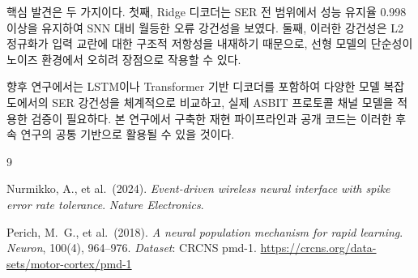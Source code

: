 \documentclass[12pt, a4paper]{article}
\begin{document}
핵심 발견은 두 가지이다.
첫째, Ridge 디코더는 SER 전 범위에서 성능 유지율 0.998 이상을 유지하여
SNN 대비 월등한 오류 강건성을 보였다.
둘째, 이러한 강건성은 L2 정규화가 입력 교란에 대한 구조적 저항성을 내재하기 때문으로,
선형 모델의 단순성이 노이즈 환경에서 오히려 장점으로 작용할 수 있다.

향후 연구에서는 LSTM이나 Transformer 기반 디코더를 포함하여
다양한 모델 복잡도에서의 SER 강건성을 체계적으로 비교하고,
실제 ASBIT 프로토콜 채널 모델을 적용한 검증이 필요하다.
본 연구에서 구축한 재현 파이프라인과 공개 코드는
이러한 후속 연구의 공통 기반으로 활용될 수 있을 것이다.

\begin{thebibliography}{9}

Nurmikko, A., et al.\ (2024).
\textit{Event-driven wireless neural interface with spike error rate tolerance}.
\textit{Nature Electronics}.

Perich, M.\ G., et al.\ (2018).
\textit{A neural population mechanism for rapid learning}.
\textit{Neuron}, 100(4), 964--976.
\textit{Dataset}: CRCNS pmd-1. \url{https://crcns.org/data-sets/motor-cortex/pmd-1}

\end{thebibliography}
\end{document}
